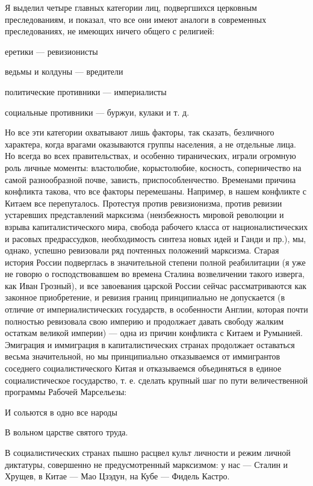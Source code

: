 Я выделил четыре главных категории лиц, подвергшихся церковным
преследованиям, и показал, что все они имеют аналоги в современных
преследованиях, не имеющих ничего общего с религией:

еретики --- ревизионисты

ведьмы и колдуны --- вредители

политические противники --- империалисты

социальные противники --- буржуи, кулаки и т. д.

Но все эти категории охватывают лишь факторы, так сказать, безличного
характера, когда врагами оказываются группы населения, а не отдельные лица. Но
всегда во всех правительствах, и особенно тиранических, играли огромную
роль личные моменты: властолюбие, корыстолюбие, косность, соперничество на
самой разнообразной почве, зависть, приспособленчество. Временами причина
конфликта такова, что все факторы перемешаны. Например, в нашем конфликте с
Китаем все перепуталось. Протестуя против ревизионизма, против ревизии
устаревших представлений марксизма (неизбежность мировой революции и взрыва
капиталистического мира, свобода рабочего класса от националистических и
расовых предрассудков, необходимость синтеза новых идей и Ганди и пр.), мы,
однако, успешно ревизовали ряд почтенных положений марксизма. Старая
история России подверглась в значительной степени полной реабилитации (я уже
не говорю о господствовавшем во времена Сталина возвеличении такого
изверга, как Иван Грозный), и все завоевания царской России сейчас
рассматриваются как законное приобретение, и ревизия границ принципиально не
допускается (в отличие от империалистических государств, в особенности
Англии, которая почти полностью ревизовала свою империю и продолжает давать
свободу жалким остаткам великой империи) --- одна из причин конфликта с
Китаем и Румынией. Эмиграция и иммиграция в капиталистических странах
продолжает оставаться весьма значительной, но мы принципиально отказываемся от
иммигрантов соседнего социалистического Китая и отказываемся объединяться в
единое социалистическое государство, т. е. сделать крупный шаг по пути
величественной программы Рабочей Марсельезы:

И сольются в одно все народы

В вольном царстве святого труда.

В социалистических странах пышно расцвел культ личности и режим личной
диктатуры, совершенно не предусмотренный марксизмом: у нас --- Сталин и
Хрущев, в Китае --- Мао Цзэдун, на Кубе --- Фидель Кастро.

